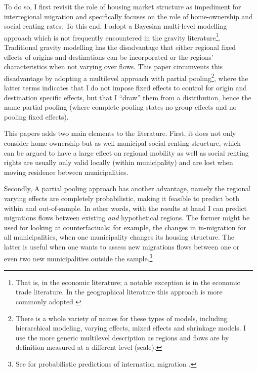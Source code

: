 \documentclass[fleqn,10pt]{SelfArx} %
\begin{document}
        
        To do so, I first revisit the role of housing market structure
        as impediment for interregional migration and specifically
        focuses on the role of home-ownership and social renting
        rates. To this end, I adopt a Bayesian multi-level modelling
        approach which is not frequently encountered in the gravity
        literature\footnote{That is, in the economic literature; a
          notable exception is \citet{ranjan2007bayesian} in the
          economic trade literature. In the geographical literature
          this approach is more commonly adopted \citep[see within a
          migration context][]{congdon2010random,
            congdon2012spatial}}. Traditional gravity modelling has
        the disadvantage that either regional fixed effects of origins
        and destinations can be incorporated or the regions'
        characteristics when not varying over flows. This paper
        circumvents this disadvantage by adopting a multilevel
        approach with partial pooling\footnote{There is a whole
          variety of names for these types of models, including
          hierarchical modeling, varying effects, mixed effects and
          shrinkage models. I use the more generic multilevel
          description as regions and flows are by definition measured
          at a different level (scale).}, where the latter terms
        indicates that I do not impose fixed effects to control for
        origin and destination specific effects, but that I ``draw''
        them from a distribution, hence the name partial pooling
        (where complete pooling states no group effects and no pooling
        fixed effects).
               
        This papers adds two main elements to the literature. First, it does not
        only consider home-ownership but as well municipal social renting
        structure, which can be argued \citep[see, e.g.,][]{boyle1998migration,
          hughes1981council} to have a large effect on regional mobility as well
        as social renting rights are usually only valid locally (within
        municipality) and are lost when moving residence between municipalities.
        
        Secondly, A partial pooling approach has another advantage, namely the
        regional varying effects are completely probabilistic, making it
        feasible to predict both within and out-of-sample. In other words, with
        the results at hand I can predict migrations flows between existing
        \emph{and} hypothetical regions. The former might be used for looking at
        counterfactuals; for example, the changes in in-migration for all
        municipalities, when one municipality changes its housing structure. The
        latter is useful when one wants to assess new migrations flows between
        one or even two new municipalities outside the sample.\footnote{See for
          probabilistic predictions of internation migration
          \cite{azose2015bayesian}.}
        
\end{document}
